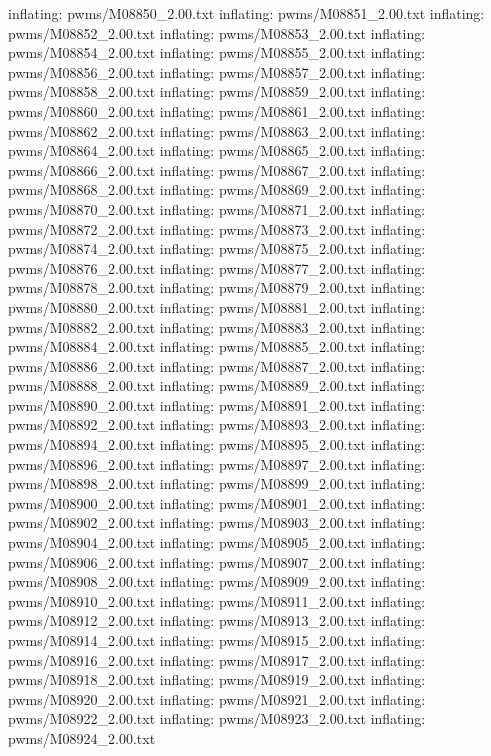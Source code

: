 \documentclass[letterpaper,10pt,english]{sphinxmanual}
\begin{document}
{\begin{sphinxVerbatim}[commandchars=\\\{\}]
  inflating: pwms/M08850\_2.00.txt
  inflating: pwms/M08851\_2.00.txt
  inflating: pwms/M08852\_2.00.txt
  inflating: pwms/M08853\_2.00.txt
  inflating: pwms/M08854\_2.00.txt
  inflating: pwms/M08855\_2.00.txt
  inflating: pwms/M08856\_2.00.txt
  inflating: pwms/M08857\_2.00.txt
  inflating: pwms/M08858\_2.00.txt
  inflating: pwms/M08859\_2.00.txt
  inflating: pwms/M08860\_2.00.txt
  inflating: pwms/M08861\_2.00.txt
  inflating: pwms/M08862\_2.00.txt
  inflating: pwms/M08863\_2.00.txt
  inflating: pwms/M08864\_2.00.txt
  inflating: pwms/M08865\_2.00.txt
  inflating: pwms/M08866\_2.00.txt
  inflating: pwms/M08867\_2.00.txt
  inflating: pwms/M08868\_2.00.txt
  inflating: pwms/M08869\_2.00.txt
  inflating: pwms/M08870\_2.00.txt
  inflating: pwms/M08871\_2.00.txt
  inflating: pwms/M08872\_2.00.txt
  inflating: pwms/M08873\_2.00.txt
  inflating: pwms/M08874\_2.00.txt
  inflating: pwms/M08875\_2.00.txt
  inflating: pwms/M08876\_2.00.txt
  inflating: pwms/M08877\_2.00.txt
  inflating: pwms/M08878\_2.00.txt
  inflating: pwms/M08879\_2.00.txt
  inflating: pwms/M08880\_2.00.txt
  inflating: pwms/M08881\_2.00.txt
  inflating: pwms/M08882\_2.00.txt
  inflating: pwms/M08883\_2.00.txt
  inflating: pwms/M08884\_2.00.txt
  inflating: pwms/M08885\_2.00.txt
  inflating: pwms/M08886\_2.00.txt
  inflating: pwms/M08887\_2.00.txt
  inflating: pwms/M08888\_2.00.txt
  inflating: pwms/M08889\_2.00.txt
  inflating: pwms/M08890\_2.00.txt
  inflating: pwms/M08891\_2.00.txt
  inflating: pwms/M08892\_2.00.txt
  inflating: pwms/M08893\_2.00.txt
  inflating: pwms/M08894\_2.00.txt
  inflating: pwms/M08895\_2.00.txt
  inflating: pwms/M08896\_2.00.txt
  inflating: pwms/M08897\_2.00.txt
  inflating: pwms/M08898\_2.00.txt
  inflating: pwms/M08899\_2.00.txt
  inflating: pwms/M08900\_2.00.txt
  inflating: pwms/M08901\_2.00.txt
  inflating: pwms/M08902\_2.00.txt
  inflating: pwms/M08903\_2.00.txt
  inflating: pwms/M08904\_2.00.txt
  inflating: pwms/M08905\_2.00.txt
  inflating: pwms/M08906\_2.00.txt
  inflating: pwms/M08907\_2.00.txt
  inflating: pwms/M08908\_2.00.txt
  inflating: pwms/M08909\_2.00.txt
  inflating: pwms/M08910\_2.00.txt
  inflating: pwms/M08911\_2.00.txt
  inflating: pwms/M08912\_2.00.txt
  inflating: pwms/M08913\_2.00.txt
  inflating: pwms/M08914\_2.00.txt
  inflating: pwms/M08915\_2.00.txt
  inflating: pwms/M08916\_2.00.txt
  inflating: pwms/M08917\_2.00.txt
  inflating: pwms/M08918\_2.00.txt
  inflating: pwms/M08919\_2.00.txt
  inflating: pwms/M08920\_2.00.txt
  inflating: pwms/M08921\_2.00.txt
  inflating: pwms/M08922\_2.00.txt
  inflating: pwms/M08923\_2.00.txt
  inflating: pwms/M08924\_2.00.txt

\end{sphinxVerbatim}}
\end{document}
